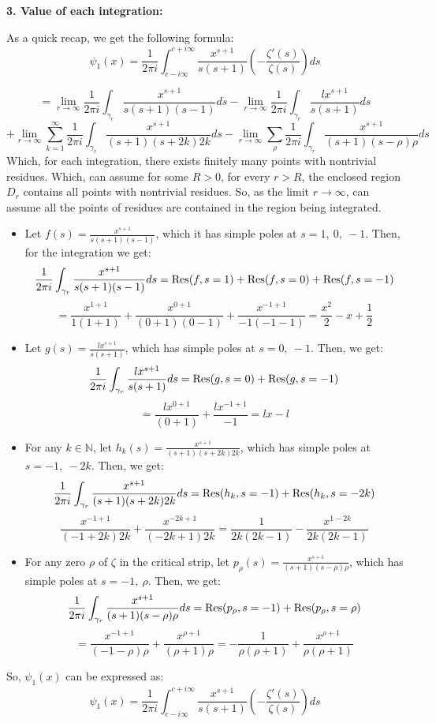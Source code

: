 \documentclass{article}
\begin{document}
\hfil

\textbf{3. Value of each integration:}

As a quick recap, we get the following formula:
$$\psi_1(x) = \frac{1}{2\pi i}\int_{c-i\infty}^{c+i\infty}\frac{x^{s+1}}{s(s+1)}\left(-\frac{\zeta'(s)}{\zeta(s)}\right)ds$$

\hfil

$$ = \lim_{r\rightarrow\infty}\frac{1}{2\pi i}\int_{\gamma_{r}}\frac{x^{s+1}}{s(s+1)(s-1)}ds-\lim_{r\rightarrow\infty}\frac{1}{2\pi i}\int_{\gamma_{r}}\frac{lx^{s+1}}{s(s+1)}ds$$
$$+ \lim_{r\rightarrow\infty}\sum_{k=1}^{\infty}\frac{1}{2\pi i}\int_{\gamma_{r}}\frac{x^{s+1}}{(s+1)(s+2k)2k}ds - \lim_{r\rightarrow\infty}\sum_{\rho}\frac{1}{2\pi i}\int_{\gamma_{r}}\frac{x^{s+1}}{(s+1)(s-\rho)\rho}ds$$
Which, for each integration, there exists finitely many points with nontrivial residues. Which, can assume for some $R>0$, for every $r>R$, the enclosed region $D_r$ contains all points with nontrivial residues. So, as the limit $r\rightarrow\infty$, can assume all the points of residues are contained in the region being integrated.
\begin{itemize}
    \item Let $f(s)=\frac{x^{s+1}}{s(s+1)(s-1)}$, which it has simple poles at $s=1,\ 0,\ -1$. Then, for the integration we get:
    $$\frac{1}{2\pi i}\int_{\gamma_{r}}\frac{x^{s+1}}{s(s+1)(s-1)}ds = \textmd{Res}(f,s=1)+\textmd{Res}(f,s=0)+\textmd{Res}(f,s=-1)$$
    $$ = \frac{x^{1+1}}{1(1+1)}+\frac{x^{0+1}}{(0+1)(0-1)} + \frac{x^{-1+1}}{-1(-1-1)} = \frac{x^2}{2}-x + \frac{1}{2}$$
    \item Let $g(s)=\frac{lx^{s+1}}{s(s+1)}$, which has simple poles at $s=0,\ -1$. Then, we get:
    $$\frac{1}{2\pi i}\int_{\gamma_r}\frac{lx^{s+1}}{s(s+1)}ds = \textmd{Res}(g,s=0)+\textmd{Res}(g,s=-1)$$
    $$ = \frac{lx^{0+1}}{(0+1)} + \frac{lx^{-1+1}}{-1} = lx - l$$
    \item For any $k\in\mathbb{N}$, let $h_k(s)=\frac{x^{s+1}}{(s+1)(s+2k)2k}$, which has simple poles at $s=-1,\ -2k$. Then, we get:
    $$\frac{1}{2\pi i}\int_{\gamma_r}\frac{x^{s+1}}{(s+1)(s+2k)2k}ds = \textmd{Res}(h_k,s=-1)+\textmd{Res}(h_k,s=-2k)$$
    $$\frac{x^{-1+1}}{(-1+2k)2k}+\frac{x^{-2k+1}}{(-2k+1)2k} = \frac{1}{2k(2k-1)}-\frac{x^{1-2k}}{2k(2k-1)}$$
    \item For any zero $\rho$ of $\zeta$ in the critical strip, let $p_\rho(s) = \frac{x^{s+1}}{(s+1)(s-\rho)\rho}$, which has simple poles at $s=-1,\ \rho$. Then, we get:
    $$\frac{1}{2\pi i}\int_{\gamma_r}\frac{x^{s+1}}{(s+1)(s-\rho)\rho}ds = \textmd{Res}(p_{\rho},s=-1)+\textmd{Res}(p_{\rho},s=\rho)$$
    $$= \frac{x^{-1+1}}{(-1-\rho)\rho}+\frac{x^{\rho+1}}{(\rho+1)\rho} = -\frac{1}{\rho(\rho+1)}+\frac{x^{\rho+1}}{\rho(\rho+1)}$$
\end{itemize}
So, $\psi_1(x)$ can be expressed as:
$$\psi_1(x) = \frac{1}{2\pi i}\int_{c-i\infty}^{c+i\infty}\frac{x^{s+1}}{s(s+1)}\left(-\frac{\zeta'(s)}{\zeta(s)}\right)ds$$
\end{document}
